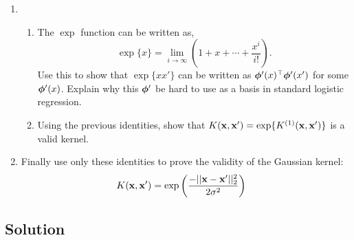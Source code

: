 \documentclass[submit]{harvardml}
\begin{document}
\begin{problem}
\begin{enumerate}
  [Hint: Use the property that for any
  $\bphi'(\boldx)$,
  $K(\boldx, \boldx') = \bphi'(\boldx)^\top\bphi'(\boldx')$ forms a
  positive semi-definite kernel matrix. ]
  \item 
  \begin{enumerate}
  	\item The $\exp$ function can be written as,
  	$$\exp\{x\} = \lim_{i\rightarrow \infty} \left(1 + x + \cdots + \frac{x^i}{i!}\right).$$
  	Use this to show that $\exp\{xx'\}$ can be written as $\boldsymbol{\phi}'(x)^\top \boldsymbol{\phi}'(x')$ for some $\boldsymbol{\phi}'(x)$. Explain why this $\boldsymbol{\phi}'$ be hard to use as a basis in standard logistic regression.
  	\item Using the previous identities, show that $K(\mathbf{x}, \mathbf{x}') = \exp\{ K^{(1)}(\mathbf{x}, \mathbf{x}') \}$ is a valid kernel.
  	

  \end{enumerate}
  \item  Finally use only these identities to prove the validity of the Gaussian kernel:
  \begin{align*}
	K(\mathbf{x}, \mathbf{x}') &= \exp \left( \frac{-||\mathbf{x} - \mathbf{x}'||^2_2}{2\sigma^2} \right) 
  \end{align*}
  \end{enumerate}



 \end{problem}
\subsection*{Solution}
\end{document}
